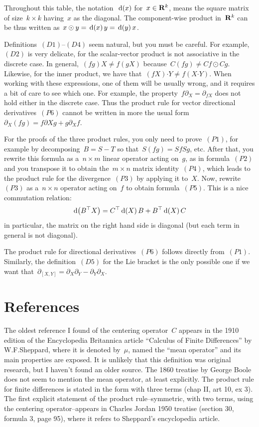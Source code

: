 Throughout this table, the notation~$\,\mathrm{d}\!\left(x\right)$ for~$x\in\mathbf{R}^k$, means the
square matrix of size~$k\times k$ having~$x$ as the diagonal.  The
component-wise product in~$\mathbf{R}^k$ can be thus written as~$x\odot
y=\,\mathrm{d}\!\left(x\right)y=\,\mathrm{d}\!\left(y\right)x$.

Definitions~$(D1)$--$(D4)$ seem natural, but you must be careful.
For example,~$(D2)$ is very delicate, for the scalar-vector product is not
associative in the discrete case.  In general,~$(fg)X\neq f(gX)$
because~$C(fg)\neq Cf\odot Cg$.
Likewise, for the inner product, we have
that~$\left(fX\right)\boldsymbol{\cdot}Y\neq f\left(X\boldsymbol{\cdot}
Y\right)$.  When working with these expressions, one of them will be usually
wrong, and it requires a bit of care to see which one.
For example, the
property~$f\partial_X=\partial_{fX}$ does not hold either in
the discrete case.  Thus the product rule for vector directional derivatives~$(P6)$ cannot be
written in more the usual form~$\partial_X(fg)=f\partial Xg+g\partial_Xf$.

For the proofs of the three
product rules, you only need to prove~$(P1)$, for
example by decomposing~$B=S-T$ so that~$S(fg)=SfSg$, etc.
After that, you rewrite this formula as
a~$n\times m$ linear operator acting on~$g$, as in formula~$(P2)$ and you
transpose it to obtain the~$m\times n$ matrix identity~$(P4)$, which leads to
the product rule for the divergence~$(P3)$ by applying it to~$X$.  Now,
rewrite~$(P3)$ as a~$n\times n$ operator acting on~$f$ to obtain
formula~$(P5)$.   This is a nice commutation relation:
\[
	\,\mathrm{d}\!\left(B^\top X\right)=C^\top\,\mathrm{d}\!\left(X\right)B+B^\top\,\mathrm{d}\!\left(X\right)C
\]
in particular, the matrix on the right hand side is diagonal (but each term
in general is not diagonal).

The product rule for directional derivatives~$(P6)$ follows directly
from~$(P1)$.  Similarly, the definition~$(D5)$ for the Lie bracket is the
only possible one if we want
that~$\partial_{[X,Y]}=\partial_X\partial_Y-\partial_Y\partial_X$.

\section{References}

The oldest reference I found of the centering operator~$C$ appears in the
1910 edition of the Encyclopedia Britannica article ``Calculus of Finite
Differences'' by W.F.Sheppard, where it is denoted by~$\mu$, named the ``mean
operator'' and its main properties are exposed.  It is unlikely that this
definition was original research, but I haven't found an older source.  The
1860 treatise by George Boole does not seem to mention the mean operator, at
least explicitly.  The product rule for finite differences is stated in the
form with three terms (chap II, art 10, ex 3).  The first explicit statement
of the product rule--symmetric, with two terms, using the centering
operator--appears in Charles Jordan 1950 treatise (section 30, formula 3,
page 95), where it refers to Sheppard's encyclopedia article.




